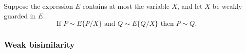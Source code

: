 \begin{theorem}
Suppose the expression $E$ contains at most the variable $X$, and let $X$ be weakly
guarded in $E$.
\begin{equation}
\text{If } P \sim E\{P/X\} \text{ and } Q \sim E\{Q/X\} \text{ then }
P \sim Q.
\end{equation}
\begin{alltt}
\HOLTokenTurnstile{}   \HOLSymConst{\HOLTokenConj{}}  \HOLSymConst{\HOLTokenStrongEQ}   \HOLSymConst{\HOLTokenConj{}}  \HOLSymConst{\HOLTokenStrongEQ}   \HOLSymConst{\HOLTokenImp{}}  \HOLSymConst{\HOLTokenStrongEQ} 
\end{alltt}
\end{theorem}

\subsubsection{Weak bisimilarity}

